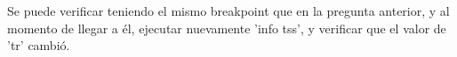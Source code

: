 Se puede verificar teniendo el mismo breakpoint que en la pregunta anterior, y al momento de llegar a él, ejecutar nuevamente 'info tss', y verificar que el valor de 'tr' cambió.